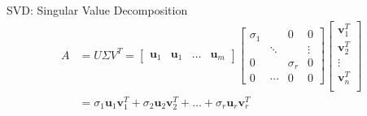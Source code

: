 \documentclass{beamer}
\begin{document}
\begin{frame}{SVD: Singular Value Decomposition}
{\begin{align*}
      A &= U \Sigma V^T
         =  \begin{bmatrix} \textbf{u}_1 & \textbf{u}_1 & \dots & \textbf{u}_m \end{bmatrix} 
            \begin{bmatrix}
              \sigma_1   &        & 0          & 0      \\
                         & \ddots &            & \vdots \\
              0          &        & \sigma_r   & 0      \\
              0          & \cdots & 0          & 0
            \end{bmatrix}
            \begin{bmatrix}
              \textbf{v}_1^T \\
              \textbf{v}_2^T \\
              \vdots \\
              \textbf{v}_n^T \\
            \end{bmatrix} \\
            &= \sigma_1 \textbf{u}_1 \textbf{v}_1^T + \sigma_2 \textbf{u}_2 \textbf{v}_2^T + \dots + \sigma_r \textbf{u}_r \textbf{v}_r^T
    \end{align*}
  }%
\end{frame}
\end{document}
